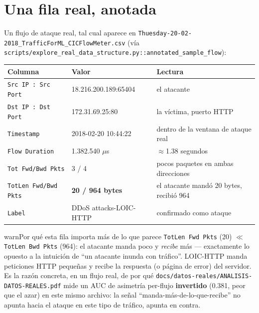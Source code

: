 \documentclass[11pt]{article}
\newcommand{\code}[1]{\texttt{\small #1}}
\begin{document}
\section{Una fila real, anotada}

Un flujo de ataque real, tal cual aparece en \code{Thuesday-20-02-2018\_TrafficForML\_CICFlowMeter.csv}
(vía \code{scripts/explore\_real\_data\_structure.py::annotated\_sample\_flow}):

\begin{center}
\begin{tabular}{@{}lll@{}}
\toprule
\textbf{Columna} & \textbf{Valor} & \textbf{Lectura} \\
\midrule
\code{Src IP : Src Port} & 18.216.200.189:65404 & el atacante \\
\code{Dst IP : Dst Port} & 172.31.69.25:80 & la víctima, puerto HTTP \\
\code{Timestamp} & 2018-02-20 10:44:22 & dentro de la ventana de ataque real \\
\code{Flow Duration} & 1.382.540 $\mu$s & $\approx$1.38 segundos \\
\code{Tot Fwd/Bwd Pkts} & 3 / 4 & pocos paquetes en ambas direcciones \\
\code{TotLen Fwd/Bwd Pkts} & \textbf{20 / 964 bytes} & el atacante mandó 20 bytes, recibió 964 \\
\code{Label} & DDoS attacks-LOIC-HTTP & confirmado como ataque \\
\bottomrule
\end{tabular}
\end{center}

\begin{cbox}{warn}{Por qué esta fila importa más de lo que parece}
\code{TotLen Fwd Pkts} (20) $\ll$ \code{TotLen Bwd Pkts} (964): el atacante manda poco y
\emph{recibe} más --- exactamente lo opuesto a la intuición de ``un atacante inunda con
tráfico''. LOIC-HTTP manda peticiones HTTP pequeñas y recibe la respuesta (o página de
error) del servidor. Es la razón concreta, en un flujo real, de por qué
\code{docs/datos-reales/ANALISIS-DATOS-REALES.pdf} mide un AUC de asimetría per-flujo
\textbf{invertido} (0.381, peor que el azar) en este mismo archivo: la señal
``manda-más-de-lo-que-recibe'' no apunta hacia el ataque en este tipo de tráfico, apunta
en contra.
\end{cbox}

\end{document}
